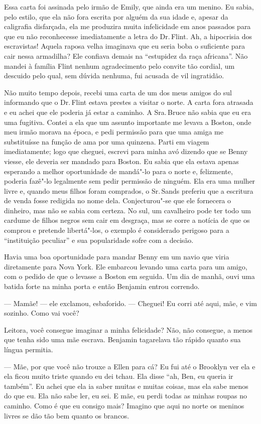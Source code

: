 Essa carta foi assinada pelo irmão de
Emily, que ainda era um menino. Eu sabia, pelo estilo, que ela não fora
escrita por alguém da sua idade e, apesar da caligrafia disfarçada, ela
me produzira muita infelicidade em anos passados para que eu não
reconhecesse imediatamente a letra do Dr.\,Flint. Ah, a hipocrisia dos
escravistas! Aquela raposa velha imaginava que eu seria boba o
suficiente para cair nessa armadilha? Ele confiava demais na ``estupidez
da raça africana''. Não mandei à família Flint nenhum agradecimento pelo
convite tão cordial, um descuido pelo qual, sem dúvida nenhuma, fui
acusada de vil ingratidão.

Não muito tempo depois, recebi uma
carta de um dos meus amigos do sul informando que o Dr.\,Flint estava
prestes a visitar o norte. A carta fora atrasada e eu achei que ele
poderia já estar a caminho. A Sra.\,Bruce não sabia que eu era uma
fugitiva. Contei a ela que um assunto importante me levava a Boston,
onde meu irmão morava na época, e pedi permissão para que uma amiga me
substituísse na função de ama por uma quinzena. Parti em viagem
imediatamente; logo que cheguei, escrevi para minha avó dizendo que se
Benny viesse, ele deveria ser mandado para Boston. Eu sabia que ela
estava apenas esperando a melhor oportunidade de mandá"-lo para o norte
e, felizmente, poderia fazê"-lo legalmente sem pedir permissão de
ninguém. Ela era uma mulher livre e, quando meus filhos foram comprados,
o Sr.\,Sands preferiu que a escritura de venda fosse redigida no nome
dela. Conjecturou"-se que ele fornecera o dinheiro, mas não se sabia com
certeza. No sul, um cavalheiro pode ter todo um cardume de filhos negros
sem cair em desgraça, mas se corre a notícia de que os comprou e
pretende libertá"-los, o exemplo é considerado perigoso para a
``instituição peculiar'' e sua popularidade sofre com a decisão.

Havia uma boa oportunidade para mandar
Benny em um navio que viria diretamente para Nova York. Ele embarcou
levando uma carta para um amigo, com o pedido de que o levasse a Boston
em seguida. Um dia de manhã, ouvi uma batida forte na minha porta e
então Benjamin entrou correndo.

--- Mamãe! --- ele exclamou, esbaforido. --- Cheguei! Eu corri até aqui,
mãe, e vim sozinho. Como vai você?

Leitora, você consegue imaginar a minha
felicidade? Não, não consegue, a menos que tenha sido uma mãe escrava.
Benjamin tagarelava tão rápido quanto sua língua permitia.

--- Mãe, por que você não trouxe a Ellen para cá? Eu fui até o Brooklyn
ver ela e ela ficou muito triste quando eu dei tchau. Ela disse ``ah,
Ben, eu queria ir também''. Eu achei que ela ia saber muitas e muitas
coisas, mas ela sabe menos do que eu. Ela não sabe ler, eu sei. E mãe,
eu perdi todas as minhas roupas no caminho. Como é que eu consigo mais?
Imagino que aqui no norte os meninos livres se dão tão bem quanto os
brancos.

